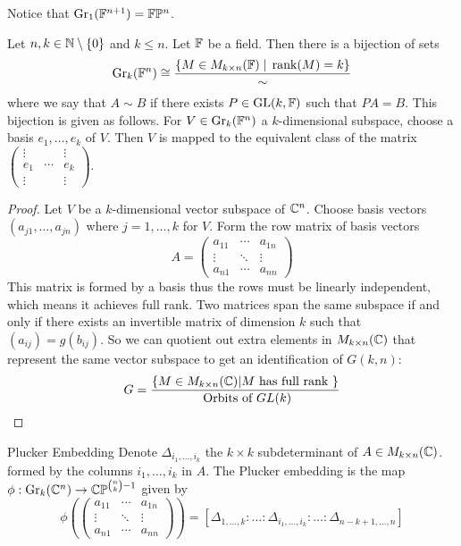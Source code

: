 \documentclass[a4paper]{article}
\begin{document}
Notice that $\operatorname{Gr}_1(\mathbb{F}^{n+1})=\mathbb{F}\mathbb{P}^n$. 

\begin{lmm}{}{} Let $n,k\in\mathbb{N}\setminus\{0\}$ and $k\leq n$. Let $\mathbb{F}$ be a field. Then there is a bijection of sets $$\operatorname{Gr}_k(\mathbb{F}^n)\cong\frac{\{M\in M_{k\times n}(\mathbb{F})\;|\;\rank(M)=k\}}{\sim}$$ where we say that $A\sim B$ if there exists $P\in\operatorname{GL}(k,\mathbb{F})$ such that $PA=B$. This bijection is given as follows. For $V\in\operatorname{Gr}_k(\mathbb{F}^n)$ a $k$-dimensional subspace, choose a basis $e_1,\dots,e_k$ of $V$. Then $V$ is mapped to the equivalent class of the matrix $\begin{pmatrix}
\vdots &&\vdots\\
e_1 & \cdots & e_k\\
\vdots &&\vdots
\end{pmatrix}$. \tcbline
\begin{proof}
Let $V$ be a $k$-dimensional vector subspace of $\mathbb{C}^n$. Choose basis vectors $(a_{j1},\dots,a_{jn})$ where $j=1,\dots,k$ for $V$. Form the row matrix of basis vectors $$A=\begin{pmatrix}a_{11} & \cdots & a_{1n}\\\vdots & \ddots & \vdots\\ a_{n1} & \cdots & a_{nn}\end{pmatrix}$$
This matrix is formed by a basis thus the rows must be linearly independent, which means it achieves full rank. Two matrices span the same subspace if and only if there exists an invertible matrix of dimension $k$ such that $(a_{ij})=g(b_{ij})$. So we can quotient out extra elements in $M_{k\times n}(\mathbb{C})$ that represent the same vector subspace to get an identification of $G(k,n)$: $$G=\frac{\{M\in M_{k\times n}(\mathbb{C})|M\text{ has full rank }\}}{\text{ Orbits of }GL(k)}$$ 
\end{proof}
\end{lmm}

\begin{defn}{Plucker Embedding}{} Denote $\Delta_{i_1,\dots,i_k}$ the $k\times k$ subdeterminant of $A\in M_{k\times n}(\mathbb{C})$. formed by the columns $i_1,\dots,i_k$ in $A$. The Plucker embedding is the map $\phi:\operatorname{Gr}_k(\mathbb{C}^n)\to\mathbb{C}\mathbb{P}^{\binom{n}{k}-1}$ given by $$\phi\left(\begin{pmatrix}a_{11} & \cdots & a_{1n}\\\vdots & \ddots & \vdots\\ a_{n1} & \cdots & a_{nn}\end{pmatrix}\right)=[\Delta_{1,\dots,k}:\dots:\Delta_{i_1,\dots,i_k}:\dots:\Delta_{n-k+1,\dots,n}]$$ 
\end{defn}
\end{document}
